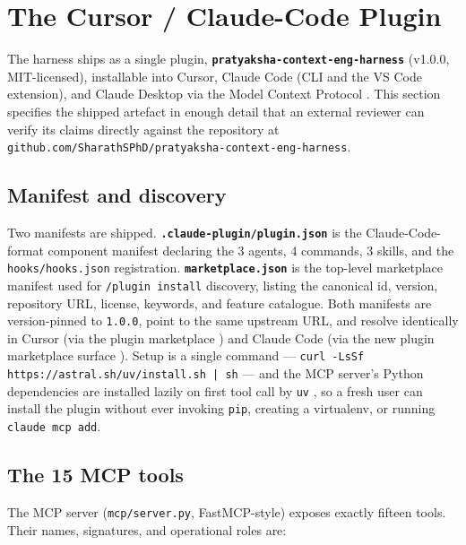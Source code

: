 \section{The Cursor / Claude-Code Plugin}\label{the-cursor-claude-code-plugin}

The harness ships as a single plugin, \textbf{\passthrough{\lstinline!pratyaksha-context-eng-harness!}} (v1.0.0, MIT-licensed), installable into Cursor, Claude Code (CLI and the VS Code extension), and Claude Desktop via the Model Context Protocol \citep{anthropic2025mcp}. This section specifies the shipped artefact in enough detail that an external reviewer can verify its claims directly against the repository at \passthrough{\lstinline!github.com/SharathSPhD/pratyaksha-context-eng-harness!}.

\subsection{Manifest and discovery}\label{manifest-and-discovery}

Two manifests are shipped. \textbf{\passthrough{\lstinline!.claude-plugin/plugin.json!}} is the Claude-Code-format component manifest declaring the 3 agents, 4 commands, 3 skills, and the \passthrough{\lstinline!hooks/hooks.json!} registration. \textbf{\passthrough{\lstinline!marketplace.json!}} is the top-level marketplace manifest used for \passthrough{\lstinline!/plugin install!} discovery, listing the canonical id, version, repository URL, license, keywords, and feature catalogue. Both manifests are version-pinned to \passthrough{\lstinline!1.0.0!}, point to the same upstream URL, and resolve identically in Cursor (via the plugin marketplace \citep{cursor2025plugins}) and Claude Code (via the new plugin marketplace surface \citep{anthropic2025claudecode}). Setup is a single command --- \passthrough{\lstinline!curl -LsSf https://astral.sh/uv/install.sh | sh!} --- and the MCP server's Python dependencies are installed lazily on first tool call by \passthrough{\lstinline!uv!} \citep{uv2025}, so a fresh user can install the plugin without ever invoking \passthrough{\lstinline!pip!}, creating a virtualenv, or running \passthrough{\lstinline!claude mcp add!}.

\subsection{The 15 MCP tools}\label{the-15-mcp-tools}

The MCP server (\passthrough{\lstinline!mcp/server.py!}, FastMCP-style) exposes exactly fifteen tools. Their names, signatures, and operational roles are:

